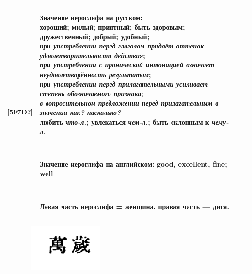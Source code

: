 \documentclass[a4paper]{article}
\begin{document}
\begin{flushleft}
\tablefirsthead{}
\tablehead{}
\tabletail{}
\tablelasttail{}
\begin{supertabular}{|m{0.9045598in}|m{6.01086in}|m{0.09415985in}|}
\hline
{\sffamily\color[rgb]{0.2,0.2,0.2} \textlatin{[597D?]}} &
{ \textsf{\textbf{\textcolor[rgb]{0.2,0.2,0.2}{Значение иероглифа на
русском:}}}\textsf{\textcolor[rgb]{0.2,0.2,0.2}{\newline
 хороший; милый; приятный; быть здоровым; дружественный; добрый; удобный; \newline
}}\textsf{\textit{\textcolor[rgb]{0.2,0.2,0.2}{при употреблении перед глаголом придаёт оттенок удовлетворительности
действия}}}\textsf{\textcolor[rgb]{0.2,0.2,0.2}{; \newline
}}\textsf{\textit{\textcolor[rgb]{0.2,0.2,0.2}{при употреблении с иронической интонацией означает неудовлетворённость
результатом}}}\textsf{\textcolor[rgb]{0.2,0.2,0.2}{; \newline
}}\textsf{\textit{\textcolor[rgb]{0.2,0.2,0.2}{при употреблении перед прилагательными усиливает степень обозначаемого
признака}}}\textsf{\textcolor[rgb]{0.2,0.2,0.2}{; \newline
}}\textsf{\textit{\textcolor[rgb]{0.2,0.2,0.2}{в вопросительном предложении перед прилагательным в значении как?
насколько?}}}\newline
\textsf{\textcolor[rgb]{0.2,0.2,0.2}{любить
}}\textsf{\textit{\textcolor[rgb]{0.2,0.2,0.2}{что-л.}}}\textsf{\textcolor[rgb]{0.2,0.2,0.2}{; увлекаться
}}\textsf{\textit{\textcolor[rgb]{0.2,0.2,0.2}{чем-л.}}}\textsf{\textcolor[rgb]{0.2,0.2,0.2}{; быть склонным к
}}\textsf{\textit{\textcolor[rgb]{0.2,0.2,0.2}{чему-л.}}}\textsf{\textcolor[rgb]{0.2,0.2,0.2}{ }}}

~

{ \textsf{\textbf{\textcolor[rgb]{0.2,0.2,0.2}{Значение иероглифа на английском:
}}}\textsf{\textcolor[rgb]{0.2,0.2,0.2}{good, excellent, fine; well}}}

~

{ \textsf{\textbf{\textcolor[rgb]{0.2,0.2,0.2}{Левая часть иероглифа = женщина, правая часть —
дитя.}}}} &
~
\\\hline
\end{supertabular}
\end{flushleft}

\bigskip

{\centering  \includegraphics[width=2.6402in,height=0.9374in]{A2-img002.png} \par}

\bigskip
\end{document}
